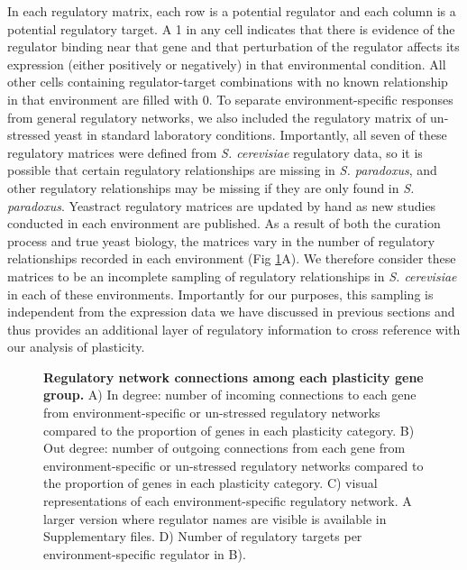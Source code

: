 In each regulatory matrix, each row is a potential regulator and each column is a potential regulatory target. A 1 in any cell indicates that there is evidence of the regulator binding near that gene and that perturbation of the regulator affects its expression (either positively or negatively) in that environmental condition. All other cells containing regulator-target combinations with no known relationship in that environment are filled with 0. To separate environment-specific responses from general regulatory networks, we also included the regulatory matrix of un-stressed yeast in standard laboratory conditions. Importantly, all seven of these regulatory matrices were defined from \textit{S. cerevisiae} regulatory data, so it is possible that certain regulatory relationships are missing in \textit{S. paradoxus}, and other regulatory relationships may be missing if they are only found in \textit{S. paradoxus}. Yeastract regulatory matrices are updated by hand as new studies conducted in each environment are published. As a result of both the curation process and true yeast biology, the matrices vary in the number of regulatory relationships recorded in each environment (Fig \ref{fig:yeastract}A). We therefore consider these matrices to be an incomplete sampling of regulatory relationships in \textit{S. cerevisiae} in each of these environments. Importantly for our purposes, this sampling is independent from the expression data we have discussed in previous sections and thus provides an additional layer of regulatory information to cross reference with our analysis of plasticity.

\begin{figure}
    \centering
    \caption{\textbf{Regulatory network connections among each plasticity gene group.} A) In degree: number of incoming connections to each gene from environment-specific or un-stressed regulatory networks compared to the proportion of genes in each plasticity category. B) Out degree: number of outgoing connections from each gene from environment-specific or un-stressed regulatory networks compared to the proportion of genes in each plasticity category. C) visual representations of each environment-specific regulatory network. A larger version where regulator names are visible is available in Supplementary files. D) Number of regulatory targets per environment-specific regulator in B).}
    \label{fig:yeastract}
\end{figure}

